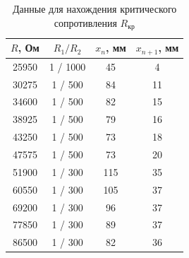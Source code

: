 \documentclass[a4paper,12pt]{article}
\begin{document}
\begin{table}[H]\label{tab: DataTheta-1otR  R_02}
    \centering
    \begin{tabular}{|c|c|c|c|}
        \hline
        {\color[HTML]{000000} $R$, Ом} & {\color[HTML]{000000} $R_1 / R_2$} & {\color[HTML]{000000} $x_n$, мм} & {\color[HTML]{000000} $x_{n + 1}$, мм} \\ \hline
        {\color[HTML]{000000} 25950} & {\color[HTML]{000000} 1 / 1000} & {\color[HTML]{000000} 45}  & {\color[HTML]{000000} 4}  \\ \hline
        {\color[HTML]{000000} 30275} & {\color[HTML]{000000} 1 / 500}  & {\color[HTML]{000000} 84}  & {\color[HTML]{000000} 11} \\ \hline
        {\color[HTML]{000000} 34600} & {\color[HTML]{000000} 1 / 500}  & {\color[HTML]{000000} 82}  & {\color[HTML]{000000} 15} \\ \hline
        {\color[HTML]{000000} 38925} & {\color[HTML]{000000} 1 / 500}  & {\color[HTML]{000000} 79}  & {\color[HTML]{000000} 16} \\ \hline
        {\color[HTML]{000000} 43250} & {\color[HTML]{000000} 1 / 500}  & {\color[HTML]{000000} 73}  & {\color[HTML]{000000} 18} \\ \hline
        {\color[HTML]{000000} 47575} & {\color[HTML]{000000} 1 / 500}  & {\color[HTML]{000000} 73}  & {\color[HTML]{000000} 20} \\ \hline
        {\color[HTML]{000000} 51900} & {\color[HTML]{000000} 1 / 300}  & {\color[HTML]{000000} 115} & {\color[HTML]{000000} 35} \\ \hline
        {\color[HTML]{000000} 60550} & {\color[HTML]{000000} 1 / 300}  & {\color[HTML]{000000} 105} & {\color[HTML]{000000} 37} \\ \hline
        {\color[HTML]{000000} 69200} & {\color[HTML]{000000} 1 / 300}  & {\color[HTML]{000000} 96}  & {\color[HTML]{000000} 37} \\ \hline
        {\color[HTML]{000000} 77850} & {\color[HTML]{000000} 1 / 300}  & {\color[HTML]{000000} 89}  & {\color[HTML]{000000} 37} \\ \hline
        {\color[HTML]{000000} 86500} & {\color[HTML]{000000} 1 / 300}  & {\color[HTML]{000000} 82}  & {\color[HTML]{000000} 36} \\ \hline
    \end{tabular}
    \caption{Данные для нахождения критического сопротивления $R_{кр}$}
\end{table}
\end{document}
